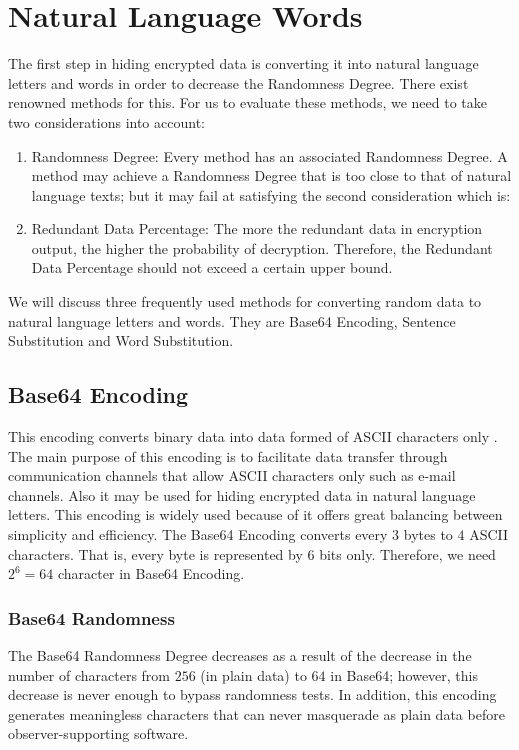 \documentclass{acm_proc_article-sp}
\begin{document}
\section{Natural Language Words}\label{Natural-Language-Words}
The first step in hiding encrypted data is converting it into natural language letters and words in order to decrease the Randomness Degree. There exist renowned methods for this. For us to evaluate these methods, we need to take two considerations into account:
\begin{enumerate}
  \item Randomness Degree: Every method has an associated Randomness Degree. A method may achieve a Randomness Degree that is too close to that of natural language texts; but it may fail at satisfying the second consideration which is:
  \item Redundant Data Percentage: The more the redundant data in encryption output, the higher the probability of decryption. Therefore, the Redundant Data Percentage should not exceed a certain upper bound.
\end{enumerate}
We will discuss three frequently used methods for converting random data to natural language letters and words. They are Base64 Encoding, Sentence Substitution and Word Substitution.

\subsection{Base64 Encoding}\label{Base64-Encoding}
This encoding converts binary data into data formed of ASCII characters only \cite{RFC}. The main purpose of this encoding is to facilitate data transfer through communication channels that allow ASCII characters only such as e-mail channels. Also it may be used for hiding encrypted data in natural language letters. This encoding is widely used because of it offers great balancing between simplicity and efficiency. The Base64 Encoding converts every $3$ bytes to $4$ ASCII characters. That is, every byte is represented by $6$ bits only. Therefore, we need $2^{6}=64$ character in Base64 Encoding.

\subsubsection{Base64 Randomness}\label{Base64-Randomness}
The Base64 Randomness Degree decreases as a result of the decrease in the number of characters from $256$ (in plain data) to $64$ in Base64; however, this decrease is never enough to bypass randomness tests. In addition, this encoding generates meaningless characters that can never masquerade as plain data before observer-supporting software.
\end{document}
